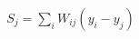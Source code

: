 \documentclass[preview]{standalone}
\begin{document}
\begin{align*}
S_j  = \sum_i W_{ij}(y_i - y_j)
\end{align*}
\end{document}
